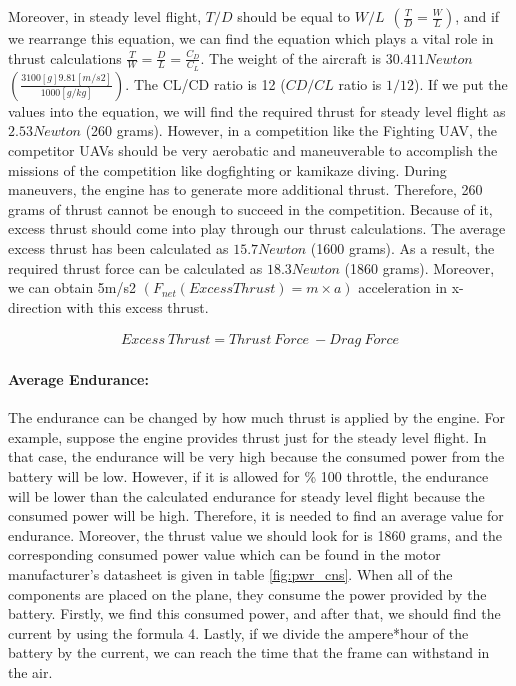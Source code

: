 \documentclass[12pt]{article}
\begin{document}
\clearpage
\justify
Moreover, in steady level flight, $T/D$ should be equal to $W/L \ \  (\frac{T}{D}=\frac{W}{L})$, and if we rearrange this equation, we can find the equation which plays a vital role in thrust calculations $\frac{T}{W}=\frac{D}{L}=\frac{C_D}{C_L}$. The weight of the aircraft is $30.411 Newton$ $(\frac{3100[g]9.81[m/s2]}{1000[g/kg]})$. The CL/CD ratio is 12 ($CD/CL$ ratio is $1/12$). If we put the values into the equation, we will find the required thrust for steady level flight as $2.53 Newton$ (260 grams). However, in a competition like the Fighting UAV, the competitor UAVs should be very aerobatic and maneuverable to accomplish the missions of the competition like dogfighting or kamikaze diving. During maneuvers, the engine has to generate more additional thrust. Therefore, 260 grams of thrust cannot be enough to succeed in the competition. Because of it, excess thrust should come into play through our thrust calculations. The average excess thrust has been calculated as $15.7 Newton$ (1600 grams). As a result, the required thrust force can be calculated as $18.3 Newton$ (1860 grams). Moreover, we can obtain 5m/s2 $(F_{net} (Excess Thrust) = m \times a )$ acceleration in x-direction with this excess thrust.       

\begin{align}
	Excess \ Thrust = Thrust \ Force \ - Drag \ Force
\end{align}

\paragraph*{Average Endurance:} The endurance can be changed by how much thrust is applied by the engine. For example, suppose the engine provides thrust just for the steady level flight. In that case, the endurance will be very high because the consumed power from the battery will be low. However, if it is allowed for \% 100 throttle, the endurance will be lower than the calculated endurance for steady level flight because the consumed power will be high. Therefore, it is needed to find an average value for endurance. Moreover, the thrust value we should look for is 1860 grams, and the corresponding consumed power value which can be found in the motor manufacturer’s datasheet is given in table \ref{fig:pwr_cns}. When all of the components are placed on the plane, they consume the power provided by the battery. Firstly, we find this consumed power, and after that, we should find the current by using the formula 4. Lastly, if we divide the ampere*hour of the battery by the current, we can reach the time that the frame can withstand in the air.
\end{document}
